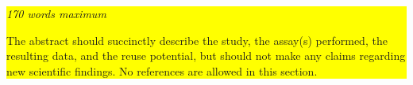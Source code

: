 \colorbox{yellow}{\textit{170 words maximum}

The abstract should succinctly describe the study, the assay(s) performed, the resulting data, and the reuse potential, but should not make any claims regarding new scientific findings.  No references are allowed in this section.} 
